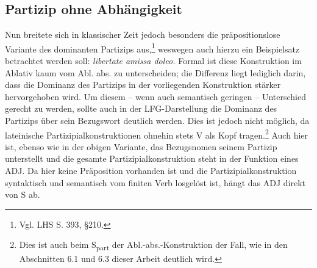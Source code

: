 \documentclass[12pt,a4paper]{article}
\begin{document}
\subsection{Partizip ohne Abhängigkeit}
Nun breitete sich in klassischer Zeit jedoch besonders die präpositionslose Variante des dominanten Partizips aus,\footnote{Vgl. LHS S. 393, §210.} weswegen auch hierzu ein Beispielsatz betrachtet werden soll: \textit{libertate amissa doleo.} Formal ist diese Konstruktion im Ablativ kaum vom Abl. abs. zu unterscheiden; die Differenz liegt lediglich darin, dass die Dominanz des Partizips in der vorliegenden Konstruktion stärker hervorgehoben wird. Um diesem -- wenn auch semantisch geringen -- Unterschied gerecht zu werden, sollte auch in der LFG-Darstellung die Dominanz des Partizips über sein Bezugswort deutlich werden. Dies ist jedoch nicht möglich, da lateinische Partizipialkonstruktionen ohnehin stets V als Kopf tragen.\footnote{Dies ist auch beim S\textsubscript{part} der Abl.-abs.-Konstruktion der Fall, wie in den Abschnitten 6.1 und 6.3 dieser Arbeit deutlich wird.}
Auch hier ist, ebenso wie in der obigen Variante, das Bezugsnomen seinem Partizip unterstellt und die gesamte Partizipialkonstruktion steht in der Funktion eines ADJ. Da hier keine Präposition vorhanden ist und die Partizipialkonstruktion syntaktisch und semantisch vom finiten Verb losgelöst ist, hängt das ADJ direkt von S ab.
\newline
\newline
\end{document}
